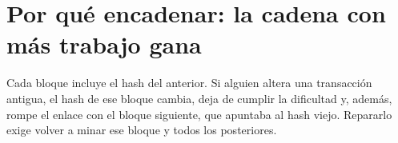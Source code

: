 \documentclass[11pt,a4paper]{article}
\newcommand{\webhint}[1]{}
\begin{document}
\section{Por qué encadenar: la cadena con más trabajo gana}\label{sec:cadena}
\webhint{section; id=sec-cadena; slug=la-cadena-con-mas-trabajo; kicker=07 — por qué encadenar; role=narrative+widget}

Cada bloque incluye el hash del anterior. Si alguien altera una transacción antigua, el hash de ese bloque cambia, deja de cumplir la dificultad y, además, rompe el enlace con el bloque siguiente, que apuntaba al hash viejo. Repararlo exige volver a minar ese bloque y todos los posteriores.
\end{document}
